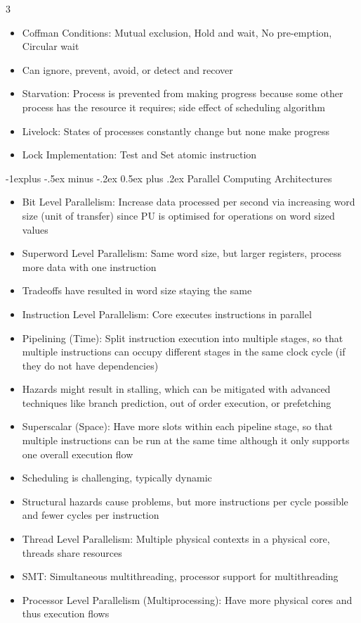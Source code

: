 \documentclass[10pt, landscape]{article}
\makeatletter
\renewcommand{\section}{\@startsection{section}{1}{0mm}%
                                {-1ex plus -.5ex minus -.2ex}%
                                {0.5ex plus .2ex}%
                                {\normalfont\large\bfseries}}
\renewcommand{\section}{\@startsection{section}{2}{0mm}%
                                {-1explus -.5ex minus -.2ex}%
                                {0.5ex plus .2ex}%
                                {\normalfont\normalsize\bfseries}}
\makeatother
\begin{document}
\begin{multicols*}{3}
\begin{itemize}
    \item Coffman Conditions: Mutual exclusion, Hold and wait, No pre-emption, Circular wait
    \item Can ignore, prevent, avoid, or detect and recover
    \item Starvation: Process is prevented from making progress because some other process has the resource it requires; side effect of scheduling algorithm
    \item Livelock: States of processes constantly change but none make progress
    \item Lock Implementation: Test and Set atomic instruction
\end{itemize}

\section{Parallel Computing Architectures}
\begin{itemize}
    \item Bit Level Parallelism: Increase data processed per second via increasing word size (unit of transfer) since PU is optimised for operations on word sized values
    \item Superword Level Parallelism: Same word size, but larger registers, process more data with one instruction
    \item Tradeoffs have resulted in word size staying the same
    \item Instruction Level Parallelism: Core executes instructions in parallel
    \item Pipelining (Time): Split instruction execution into multiple stages, so that multiple instructions can occupy different stages in the same clock cycle (if they do not have dependencies)
    \item Hazards might result in stalling, which can be mitigated with advanced techniques like branch prediction, out of order execution, or prefetching
    \item Superscalar (Space): Have more slots within each pipeline stage, so that multiple instructions can be run at the same time although it only supports one overall execution flow
    \item Scheduling is challenging, typically dynamic
    \item Structural hazards cause problems, but more instructions per cycle possible and fewer cycles per instruction
    \item Thread Level Parallelism: Multiple physical contexts in a physical core, threads share resources
    \item SMT: Simultaneous multithreading, processor support for multithreading
    \item Processor Level Parallelism (Multiprocessing): Have more physical cores and thus execution flows
\end{itemize}


\end{multicols*}
\end{document}
